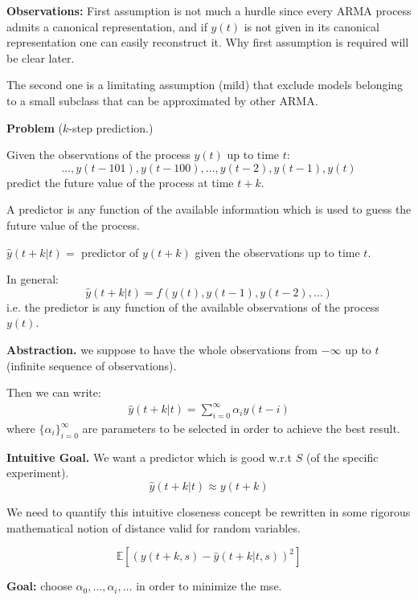 \textbf{Observations:}
First assumption is not much a hurdle since every ARMA process admits a canonical representation, and if $y(t)$ is not given in its canonical representation one can easily reconstruct it. Why first assumption is required will be clear later. 

The second one is a limitating assumption (mild) that exclude models belonging to a small subclass that can be approximated by other ARMA.

\textbf{Problem} ($k$-step prediction.)

Given the observations of the process $y(t)$ up to time $t$:
$$
	\ldots , y(t-101), y(t-100), \ldots , y(t-2), y(t-1), y(t)
$$
predict the future value of the process at time $t + k$.


A predictor is any function of the available information which is used to guess the future value of the process.

$\hat{y}(t + k | t) =$ predictor of $y(t + k)$ given the observations up to time $t$.

In general: 
$$\hat{y}(t + k | t) = f ( y(t), y(t-1), y(t-2),\ldots)$$
i.e. the predictor is any function of the available observations of the process $y(t)$.

\textbf{Abstraction.} we suppose to have the whole observations from $-\infty$ up to $t$ (infinite sequence of observations).

Then we can write:
\begin{align*}
	\hat{y}(t + k | t)=\sum_{i=0}^{\infty}\alpha_i y(t-i)
\end{align*}
where ${\{\alpha_i\}}_{i=0}^\infty$ are parameters to be selected in order to achieve the best result.

\textbf{Intuitive Goal.} 
We want a predictor which is good w.r.t $S$ (of the specific experiment).
$$\hat{y}(t + k | t)\approx y(t+k) $$

We need to quantify this intuitive closeness concept be rewritten in some rigorous mathematical notion of distance valid for random variables.

\begin{definition}
	\[
		\mathbb{E}[(y(t+k,s)-\hat{y}(t+k|t,s))^2]
	\]
\end{definition}

\textbf{Goal:} choose $\alpha_0,\ldots,\alpha_i,\ldots$ in order to minimize the \gls{mse}.